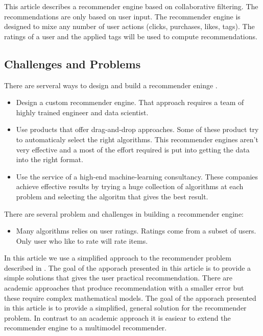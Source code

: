 This article describes a recommender engine based on collaborative filtering. The recommendations are only based on user input. The recommender engine is designed to mixe any number of user actions (clicks, purchases, likes, tags). The ratings of a user and the applied tags will be used to compute recommendations.

\subsection{Challenges and Problems}

There are serveral ways to design and build a recommender eninge \cite{Dunning14}.

\begin{itemize}
\item Design a custom recommender engine. That approach requires a team of highly trained engineer and data scientist.
\item Use products that offer drag-and-drop approaches. Some of these product try to automaticaly select the right algorithms. This recommender engines aren't very effective and a most of the effort required is put into getting the data into the right format.
\item Use the service of a high-end machine-learning consultancy. These companies achieve effective results by trying a huge collection of algorithms at each problem and selecting the algoritm that gives the best result.
\end{itemize}

There are several problem and challenges in building a recommender engine:
\begin{itemize}
\item Many algorithms relies on user ratings. Ratings come from a subset of users. Only user who like to rate will rate items. 
\end{itemize}

In this article we use a simplified approach to the recommender problem described in \cite{Dunning14}. The goal of the apporach presented in this article is to provide a simple solutions that gives the user practical recommendation. There are academic approaches that produce recommendation with a smaller error but these require complex mathematical models. The goal of the apporach presented in this article is to provide a simplified, general solution for the recommender problem. In contrast to an academic approach it is easiear to extend the recommender engine to a multimodel recommender.

